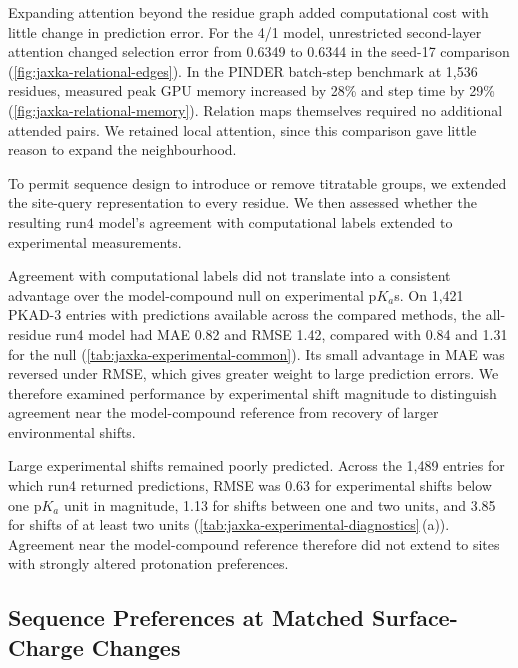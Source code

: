 Expanding attention beyond the residue graph added computational cost with little change in prediction error. For the 4/1 model, unrestricted second-layer attention changed selection error from 0.6349 to 0.6344 in the seed-17 comparison (\cref{fig:jaxka-relational-edges}). In the PINDER batch-step benchmark at 1,536 residues, measured peak GPU memory increased by 28\% and step time by 29\% (\cref{fig:jaxka-relational-memory}). Relation maps themselves required no additional attended pairs. We retained local attention, since this comparison gave little reason to expand the neighbourhood.

To permit sequence design to introduce or remove titratable groups, we extended the site-query representation to every residue. We then assessed whether the resulting run4 model's agreement with computational labels extended to experimental measurements.

Agreement with computational labels did not translate into a consistent advantage over the model-compound null on experimental $\mathrm{p}K_a$s. On 1,421 PKAD-3 entries with predictions available across the compared methods, the all-residue run4 model had MAE 0.82 and RMSE 1.42, compared with 0.84 and 1.31 for the null (\cref{tab:jaxka-experimental-common}). Its small advantage in MAE was reversed under RMSE, which gives greater weight to large prediction errors. We therefore examined performance by experimental shift magnitude to distinguish agreement near the model-compound reference from recovery of larger environmental shifts.

Large experimental shifts remained poorly predicted. Across the 1,489 entries for which run4 returned predictions, RMSE was 0.63 for experimental shifts below one $\mathrm{p}K_a$ unit in magnitude, 1.13 for shifts between one and two units, and 3.85 for shifts of at least two units (\cref{tab:jaxka-experimental-diagnostics}\,(a)). Agreement near the model-compound reference therefore did not extend to sites with strongly altered protonation preferences.

\subsection{Sequence Preferences at Matched Surface-Charge Changes}
\label{sec:jaxka-sequence-results}

